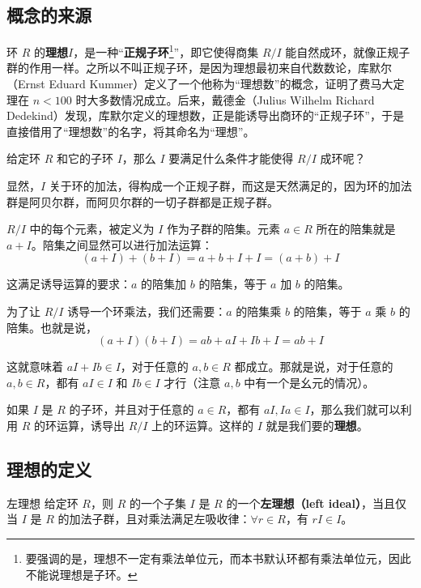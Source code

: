 
\subsection{概念的来源}

环 $R$ 的\textbf{理想}$I$，是一种“\textbf{正规子环}\footnote{要强调的是，理想不一定有乘法单位元，而本书默认环都有乘法单位元，因此不能说理想是子环。}”，即它使得商集 $R/I$ 能自然成环，就像正规子群的作用一样。之所以不叫正规子环，是因为理想最初来自代数数论，库默尔（Ernst Eduard Kummer）定义了一个他称为“理想数”的概念，证明了费马大定理在 $n<100$ 时大多数情况成立。后来，戴德金（Julius Wilhelm Richard Dedekind）发现，库默尔定义的理想数，正是能诱导出商环的“正规子环”，于是直接借用了“理想数”的名字，将其命名为“理想”。

给定环 $R$ 和它的子环 $I$，那么 $I$ 要满足什么条件才能使得 $R/I$ 成环呢？

显然，$I$ 关于环的加法，得构成一个正规子群，而这是天然满足的，因为环的加法群是阿贝尔群，而阿贝尔群的一切子群都是正规子群。

$R/I$ 中的每个元素，被定义为 $I$ 作为子群的陪集。元素 $a\in R$ 所在的陪集就是 $a+I$。陪集之间显然可以进行加法运算：
\begin{equation}
(a+I)+(b+I)=a+b+I+I=(a+b)+I
\end{equation}

这满足诱导运算的要求：$a$ 的陪集加 $b$ 的陪集，等于 $a$ 加 $b$ 的陪集。

为了让 $R/I$ 诱导一个环乘法，我们还需要：$a$ 的陪集乘 $b$ 的陪集，等于 $a$ 乘 $b$ 的陪集。也就是说，
\begin{equation}
(a+I)(b+I)=ab+aI+Ib+I=ab+I
\end{equation}

这就意味着 $aI+Ib\in I$，对于任意的 $a, b\in R$ 都成立。那就是说，对于任意的 $a, b\in R$，都有 $aI\in I$ 和 $Ib\in I$ 才行（注意 $a, b$ 中有一个是幺元的情况）。

如果 $I$ 是 $R$ 的子环，并且对于任意的 $a\in R$，都有 $aI, Ia\in I$，那么我们就可以利用 $R$ 的环运算，诱导出 $R/I$ 上的环运算。这样的 $I$ 就是我们要的\textbf{理想}。

\subsection{理想的定义}

\begin{definition}{左理想}
给定环 $R$，则 $R$ 的一个子集 $I$ 是 $R$ 的一个\textbf{左理想（left ideal）}，当且仅当 $I$ 是 $R$ 的加法子群，且对乘法满足左吸收律：$\forall r\in R$，有 $rI\in I$。
\end{definition}


